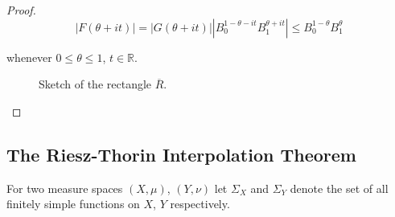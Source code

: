 \begin{proof}
\begin{equation*}
	\left| F(\theta + it) \right| = \left| G(\theta + it) \right| \left| B_0^{1 - \theta - it}B_1^{\theta + it}\right| \leqslant B_0^{1 - \theta} B_1^{\theta}
\end{equation*}

whenever $0 \leqslant \theta \leqslant 1$, $t \in \mathbb{R}$.

\begin{figure}[h!tb]
	\centering
	\caption[Hadamard's three lines lemma: sketch of the rectangle $\overline{R}$]{Sketch of the rectangle $\overline{R}$.}
	\label{fig:Hadamards_three_lines_lemma}
\end{figure}
\end{proof}

\subsection{The Riesz-Thorin Interpolation Theorem}
For two measure spaces $\left( X,\mu \right)$, $\left( Y,\nu \right)$ let $\Sigma_X$ and $\Sigma_Y$ denote the set of all finitely simple functions on $X$, $Y$ respectively.

\vspace{2mm}

